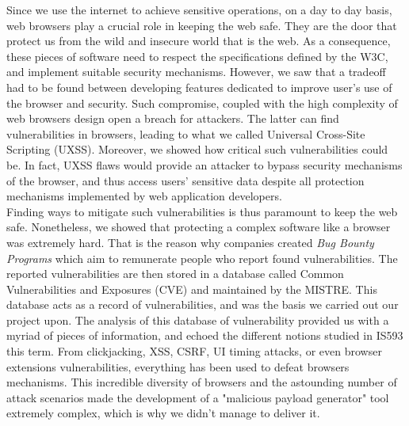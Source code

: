 \documentclass[journal]{IEEEtran}
\begin{document}
Since we use the internet to achieve sensitive operations, on a day to day basis, web browsers play a crucial role in keeping the web safe. They are the door that protect us from the wild and insecure world that is the web. As a consequence, these pieces of software need to respect the specifications defined by the W3C, and implement suitable security mechanisms. However, we saw that a tradeoff had to be found between developing features dedicated to improve user's use of the browser and security. Such compromise, coupled with the high complexity of web browsers design open a breach for attackers. The latter can find vulnerabilities in browsers, leading to what we called Universal Cross-Site Scripting (UXSS). Moreover, we showed how critical such vulnerabilities could be. In fact, UXSS flaws would provide an attacker to bypass security mechanisms of the browser, and thus access users' sensitive data despite all protection mechanisms implemented by web application developers. \\
Finding ways to mitigate such vulnerabilities is thus paramount to keep the web safe. Nonetheless, we showed that protecting a complex software like a browser was extremely hard. That is the reason why companies created \emph{Bug Bounty Programs} which aim to remunerate people who report found vulnerabilities. The reported vulnerabilities are then stored in a database called Common Vulnerabilities and Exposures (CVE) and maintained by the MISTRE. This database acts as a record of vulnerabilities, and was the basis we carried out our project upon. The analysis of this database of vulnerability provided us with a myriad of pieces of information, and echoed the different notions studied in IS593 this term. From clickjacking, XSS, CSRF, UI timing attacks, or even browser extensions vulnerabilities, everything has been used to defeat browsers mechanisms. This incredible diversity of browsers and the astounding number of attack scenarios made the development of a "malicious payload generator" tool extremely complex, which is why we didn't manage to deliver it.

\medskip
\end{document}
